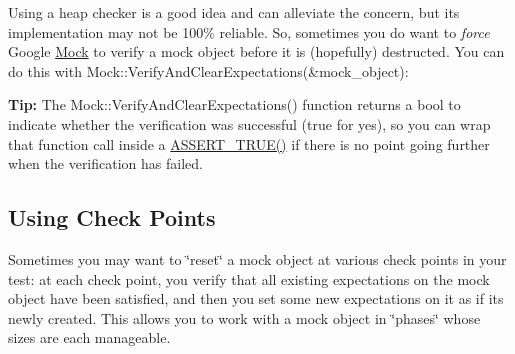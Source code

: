 Using a heap checker is a good idea and can alleviate the concern, but its implementation may not be 100\% reliable. So, sometimes you do want to {\itshape force} Google \mbox{\hyperlink{class_mock}{Mock}} to verify a mock object before it is (hopefully) destructed. You can do this with {\ttfamily Mock\+::\+Verify\+And\+Clear\+Expectations(\&mock\+\_\+object)}\+:


\begin{DoxyCode}{0}
\DoxyCodeLine{}
\DoxyCodeLine{  \textcolor{comment}{// ... other expectations ...}}
\DoxyCodeLine{}
\DoxyCodeLine{  \textcolor{comment}{// server now owns foo.}}
\DoxyCodeLine{}
\DoxyCodeLine{  \textcolor{comment}{// In case that server's destructor will forget to delete foo,}}
\DoxyCodeLine{  \textcolor{comment}{// this will verify the expectations anyway.}}
\DoxyCodeLine{\}  \textcolor{comment}{// server is destroyed when it goes out of scope here.}}
\end{DoxyCode}


{\bfseries{Tip\+:}} The {\ttfamily Mock\+::\+Verify\+And\+Clear\+Expectations()} function returns a {\ttfamily bool} to indicate whether the verification was successful ({\ttfamily true} for yes), so you can wrap that function call inside a {\ttfamily \mbox{\hyperlink{googletest-master_2googletest_2include_2gtest_2gtest_8h_ae9244bfbda562e8b798789b001993fa5}{A\+S\+S\+E\+R\+T\+\_\+\+T\+R\+U\+E()}}} if there is no point going further when the verification has failed.

\subsection*{Using Check Points}

Sometimes you may want to \char`\"{}reset\char`\"{} a mock object at various check points in your test\+: at each check point, you verify that all existing expectations on the mock object have been satisfied, and then you set some new expectations on it as if it\textquotesingle{}s newly created. This allows you to work with a mock object in \char`\"{}phases\char`\"{} whose sizes are each manageable.

